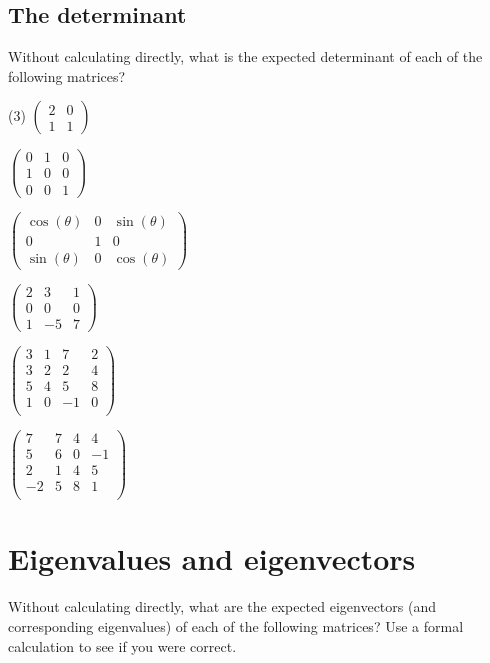 \documentclass{article}
\begin{document}
\subsection{The determinant}
Without calculating directly, what is the expected determinant of each
of the following matrices?

\begin{tasks}[label-width=1.5em](3)
  \task $
  \begin{pmatrix} 2 & 0 \\ 1 & 1
  \end{pmatrix}$

  \task $
  \begin{pmatrix} 0 & 1 & 0 \\ 1 & 0 & 0 \\ 0 & 0 & 1
  \end{pmatrix}$

  \task $
  \begin{pmatrix} \cos(\theta) & 0 & \sin(\theta) \\ 0 & 1 & 0
    \\ \sin(\theta) & 0 & \cos(\theta)
  \end{pmatrix}$

  \task $
  \begin{pmatrix} 2 & 3 & 1 \\ 0 & 0 & 0 \\ 1 & -5 & 7
  \end{pmatrix}$

  \task $
  \begin{pmatrix}
    3 & 1 & 7  & 2\\
    3 & 2 & 2  & 4\\
    5 & 4 & 5  & 8\\
    1 & 0 & -1 & 0 \\
  \end{pmatrix}$

  \task $
  \begin{pmatrix}
    7 & 7 & 4 & 4 \\
    5 & 6 & 0 & -1 \\
    2 & 1 & 4 & 5 \\
    -2 & 5 & 8 & 1 \\
  \end{pmatrix}$
\end{tasks}

\section{Eigenvalues and eigenvectors}
Without calculating directly, what are the expected eigenvectors (and
corresponding eigenvalues) of each of the following matrices? Use a
formal calculation to see if you were correct.
\end{document}
